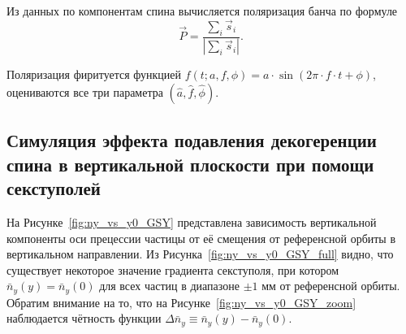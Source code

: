 Из данных по компонентам спина вычисляется поляризация банча по
формуле
\begin{equation}\label{eq:polarization_formula}
\vec P = \frac{\sum_i\vec s_i}{|\sum_i\vec s_i|}.
\end{equation}

Поляризация фиритуется функцией $f(t; a,f,\phi) = a\cdot \sin(2\pi\cdot
f\cdot t + \phi)$, оцениваются все три параметра $(\hat a, \hat f,
\hat\phi)$. 

\subsection{Симуляция эффекта подавления декогеренции спина в вертикальной плоскости при помощи секступолей}
На Рисунке~\ref{fig:ny_vs_y0_GSY} представлена зависимость вертикальной компоненты оси прецессии частицы от её смещения от референсной орбиты в вертикальном направлении. Из Рисунка~\ref{fig:ny_vs_y0_GSY_full} видно, что существует некоторое значение градиента секступоля, при котором $\bar n_y(y) = \bar n_y(0)$ для всех частиц в диапазоне $\pm 1$ мм от референсной орбиты. Обратим внимание на то, что на Рисунке~\ref{fig:ny_vs_y0_GSY_zoom} наблюдается чётность функции $\Delta\bar n_y \equiv \bar n_y(y) - \bar n_y(0)$.

